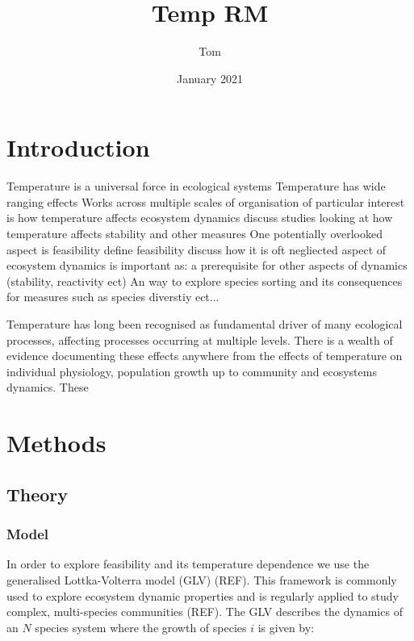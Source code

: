 \documentclass{article}
\title{Temp RM}
\author{Tom}
\date{January 2021}
\begin{document}
\maketitle

\section{Introduction}
\begin{outline}
    \1 Temperature is a universal force in ecological systems
        \2 Temperature has wide ranging effects
        \2 Works across multiple scales of organisation
    \1 of particular interest is how temperature affects ecosystem dynamics 
        \2 discuss studies looking at how temperature affects stability and other measures
    \1 One potentially overlooked aspect is feasibility 
        \2 define feasibility
        \2 discuss how it is oft negliected aspect of ecosystem dynamics
        \2 is important as:
            \3 a prerequisite for other aspects of dynamics (stability, reactivity ect) 
            \3 An way to explore species sorting and its consequences for measures such as species diverstiy ect...  
\end{outline}

Temperature has long been recognised as fundamental driver of many ecological processes, affecting processes occurring at multiple levels. There is a wealth of evidence documenting these effects anywhere from the effects of temperature on individual physiology,  population growth up to community and ecosystems dynamics. These 

\section{Methods}

\subsection{Theory}
\subsubsection{Model}
In order to explore feasibility and its temperature dependence we use the generalised Lottka-Volterra model (GLV) (REF). This framework is commonly used to explore ecosystem dynamic properties and is regularly applied to study complex, multi-species communities (REF). The GLV describes the dynamics of an $N$ species system where the growth of species $i$ is given by:
\end{document}
